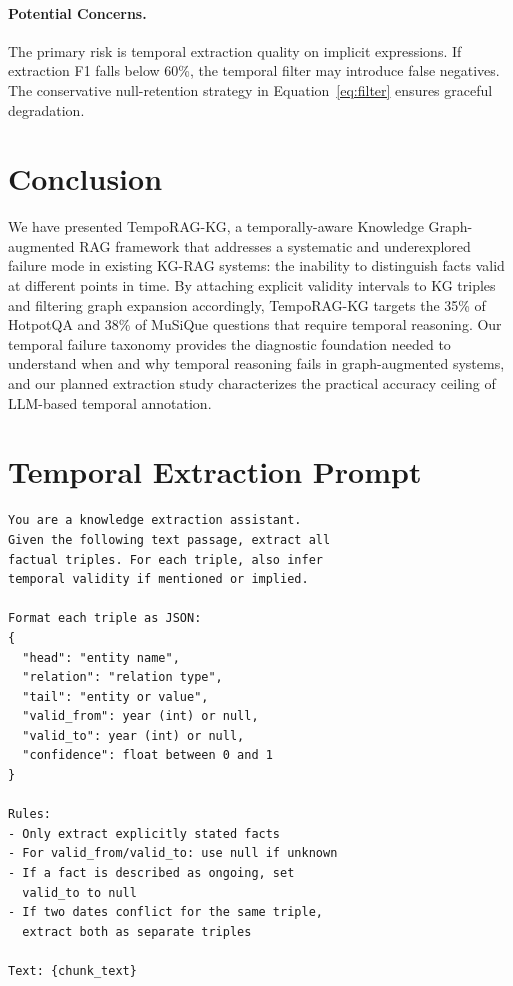 \documentclass[11pt]{article}
\begin{document}
\paragraph{Potential Concerns.}
The primary risk is temporal extraction quality on implicit expressions.
If extraction F1 falls below 60\%, the temporal filter may introduce
false negatives. The conservative null-retention strategy in
Equation~\ref{eq:filter} ensures graceful degradation.

\section{Conclusion}

We have presented TempoRAG-KG, a temporally-aware Knowledge Graph-augmented
RAG framework that addresses a systematic and underexplored failure mode in
existing KG-RAG systems: the inability to distinguish facts valid at
different points in time. By attaching explicit validity intervals to KG
triples and filtering graph expansion accordingly, TempoRAG-KG targets the
35\% of HotpotQA and 38\% of MuSiQue questions that require temporal
reasoning. Our temporal failure taxonomy provides the diagnostic foundation
needed to understand when and why temporal reasoning fails in
graph-augmented systems, and our planned extraction study characterizes
the practical accuracy ceiling of LLM-based temporal annotation.



\appendix

\section{Temporal Extraction Prompt}
\label{app:prompt}

{\small\begin{verbatim}
You are a knowledge extraction assistant.
Given the following text passage, extract all
factual triples. For each triple, also infer
temporal validity if mentioned or implied.

Format each triple as JSON:
{
  "head": "entity name",
  "relation": "relation type",
  "tail": "entity or value",
  "valid_from": year (int) or null,
  "valid_to": year (int) or null,
  "confidence": float between 0 and 1
}

Rules:
- Only extract explicitly stated facts
- For valid_from/valid_to: use null if unknown
- If a fact is described as ongoing, set
  valid_to to null
- If two dates conflict for the same triple,
  extract both as separate triples

Text: {chunk_text}
\end{verbatim}}
\end{document}
